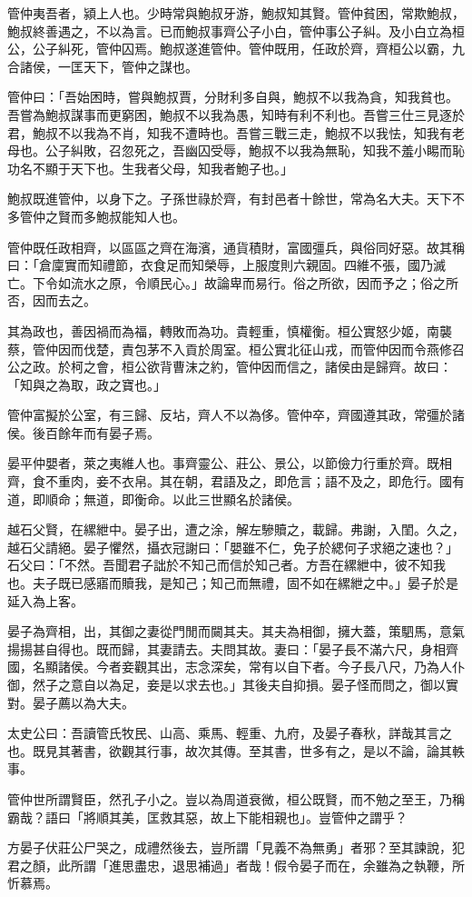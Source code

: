 
\begin{pinyinscope}
管仲夷吾者，潁上人也。少時常與鮑叔牙游，鮑叔知其賢。管仲貧困，常欺鮑叔，鮑叔終善遇之，不以為言。已而鮑叔事齊公子小白，管仲事公子糾。及小白立為桓公，公子糾死，管仲囚焉。鮑叔遂進管仲。管仲既用，任政於齊，齊桓公以霸，九合諸侯，一匡天下，管仲之謀也。

管仲曰：「吾始困時，嘗與鮑叔賈，分財利多自與，鮑叔不以我為貪，知我貧也。吾嘗為鮑叔謀事而更窮困，鮑叔不以我為愚，知時有利不利也。吾嘗三仕三見逐於君，鮑叔不以我為不肖，知我不遭時也。吾嘗三戰三走，鮑叔不以我怯，知我有老母也。公子糾敗，召忽死之，吾幽囚受辱，鮑叔不以我為無恥，知我不羞小睗而恥功名不顯于天下也。生我者父母，知我者鮑子也。」

鮑叔既進管仲，以身下之。子孫世祿於齊，有封邑者十餘世，常為名大夫。天下不多管仲之賢而多鮑叔能知人也。

管仲既任政相齊，以區區之齊在海濱，通貨積財，富國彊兵，與俗同好惡。故其稱曰：「倉廩實而知禮節，衣食足而知榮辱，上服度則六親固。四維不張，國乃滅亡。下令如流水之原，令順民心。」故論卑而易行。俗之所欲，因而予之；俗之所否，因而去之。

其為政也，善因禍而為福，轉敗而為功。貴輕重，慎權衡。桓公實怒少姬，南襲蔡，管仲因而伐楚，責包茅不入貢於周室。桓公實北征山戎，而管仲因而令燕修召公之政。於柯之會，桓公欲背曹沫之約，管仲因而信之，諸侯由是歸齊。故曰：「知與之為取，政之寶也。」

管仲富擬於公室，有三歸、反坫，齊人不以為侈。管仲卒，齊國遵其政，常彊於諸侯。後百餘年而有晏子焉。

晏平仲嬰者，萊之夷維人也。事齊靈公、莊公、景公，以節儉力行重於齊。既相齊，食不重肉，妾不衣帛。其在朝，君語及之，即危言；語不及之，即危行。國有道，即順命；無道，即衡命。以此三世顯名於諸侯。

越石父賢，在縲紲中。晏子出，遭之涂，解左驂贖之，載歸。弗謝，入閨。久之，越石父請絕。晏子懼然，攝衣冠謝曰：「嬰雖不仁，免子於緦何子求絕之速也？」石父曰：「不然。吾聞君子詘於不知己而信於知己者。方吾在縲紲中，彼不知我也。夫子既已感寤而贖我，是知己；知己而無禮，固不如在縲紲之中。」晏子於是延入為上客。

晏子為齊相，出，其御之妻從門閒而闚其夫。其夫為相御，擁大蓋，策駟馬，意氣揚揚甚自得也。既而歸，其妻請去。夫問其故。妻曰：「晏子長不滿六尺，身相齊國，名顯諸侯。今者妾觀其出，志念深矣，常有以自下者。今子長八尺，乃為人仆御，然子之意自以為足，妾是以求去也。」其後夫自抑損。晏子怪而問之，御以實對。晏子薦以為大夫。

太史公曰：吾讀管氏牧民、山高、乘馬、輕重、九府，及晏子春秋，詳哉其言之也。既見其著書，欲觀其行事，故次其傳。至其書，世多有之，是以不論，論其軼事。

管仲世所謂賢臣，然孔子小之。豈以為周道衰微，桓公既賢，而不勉之至王，乃稱霸哉？語曰「將順其美，匡救其惡，故上下能相親也」。豈管仲之謂乎？

方晏子伏莊公尸哭之，成禮然後去，豈所謂「見義不為無勇」者邪？至其諫說，犯君之顏，此所謂「進思盡忠，退思補過」者哉！假令晏子而在，余雖為之執鞭，所忻慕焉。


\end{pinyinscope}